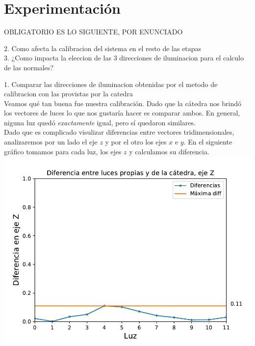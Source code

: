 \section{Experimentación}

OBLIGATORIO ES LO SIGUIENTE, POR ENUNCIADO

2. Como afecta la calibracion del sistema en el resto de las etapas \\
3. ¿Como impacta la eleccion de las 3 direcciones de iluminacion para el calculo de las normales? \\



1. Comparar las direcciones de iluminacion obtenidas por el metodo de calibracion con las provistas por la catedra \\

Veamos qué tan buena fue nuestra calibración. Dado que la cátedra nos brindó los vectores de luces lo que nos gustaría hacer es comparar ambos. En general, niguna luz quedó \textit{exactamente} igual, pero sí quedaron similares. \\

Dado que es complicado visulizar diferencias entre vectores tridimensionales, analizaremos por un lado el eje $z$ y por el otro los ejes $x$ e $y$. En el siguiente gráfico tomamos para cada luz, los ejes $z$ y calculamos su diferencia. \\

{\centering
    \includegraphics[scale=0.7]{informe/imagenes/lucesEjezDiferencias.pdf} \\
}

